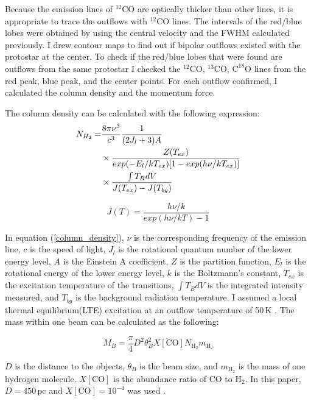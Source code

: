 Because the emission lines of $^{12}$CO are optically thicker than other lines, it is appropriate to trace the outflows with $^{12}$CO lines. The intervals of the red/blue lobes were obtained by using the central velocity and the FWHM calculated previously. I drew contour maps to find out if bipolar outflows existed with the protostar at the center. To check if the red/blue lobes that were found are outflows from the same protostar I checked the $^{12}$CO, $^{13}$CO, $\textrm{C}^{18}\textrm{O}$ lines from the red peak, blue peak, and the center points. For each outflow confirmed, I calculated the column density and the momentum force.

The column density can be calculated with the following expression:
\begin{align}
	N_{H_2} =& \frac{8\pi \nu^3}{c^3} \frac{1}{(2J_l +3)A}  \notag \\
	& \times \frac{Z(T_{ex})}{exp(-E_l / kT_{ex})[1-exp(h\nu / kT_{ex})]} \notag \\
	& \times \frac{\int T_B dV}{J(T_{ex})-J(T_{bg})} \label{column_density}
\end{align}

\begin{equation}
J(T) = \frac{h \nu / k}{exp(h\nu / kT)-1}
\end{equation}

In equation (\ref{column_density}), $\nu$ is the corresponding frequency of the emission line, $c$ is the speed of light, $J_l$ is the rotational quantum number of the lower energy level, $A$ is the Einstein A coefficient, $Z$ is the partition function, $E_l$ is the rotational energy of the lower energy level, $k$ is the Boltzmann's constant, $T_{ex}$ is the excitation temperature of the transitions, $\int T_B dV$ is the integrated intensity measured, and $T_{bg}$ is the background radiation temperature. I assumed a local thermal equilibrium(LTE) excitation at an outflow temperature of 50$\,$K \cite{takahashi2008millimeter}.
The mass within one beam can be calculated as the following:

\begin{equation}
M_B =  \frac{\pi}{4} D^2 \theta_B ^2 X[\textrm{CO}] N_{\textrm{H}_2} m_{\textrm{H}_2} \label{beam_mass}
\end{equation}

$D$ is the distance to the objects, $\theta_B$ is the beam size, and $m_{\textrm{H}_2}$ is the mass of one hydrogen molecule. $X[\textrm{CO}]$ is the abundance ratio of CO to $\textrm{H}_2$. In this paper, $D = 450\,\textrm{pc}$ and $X[\textrm{CO}] = 10^{-4}$ was used \cite{hatchell2007star}.\\

